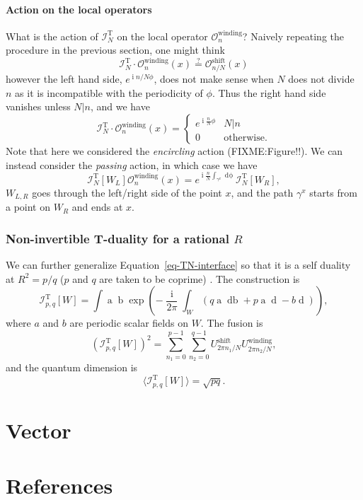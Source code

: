 \documentclass[
  letterpaper,
  DIV=11,
  numbers=noendperiod]{scrreport}
\DeclareMathOperator{\imunit}{i}
\begin{document}
\subsubsection{Action on the local
operators}\label{action-on-the-local-operators}

What is the action of \(\mathcal{I}_N^\text{T}\) on the local operator
\(\mathcal{O}^\text{winding}_n\)? Naively repeating the procedure in the
previous section, one might think \[
\mathcal{I}_N^\text{T} \cdot \mathcal{O}^\text{winding}_n(x) \stackrel{?}{=} \mathcal{O}^\text{shift}_{n/N}(x)
\] however the left hand side, \(e^{\imunit n/N \phi}\), does not make
sense when \(N\) does not divide \(n\) as it is incompatible with the
periodicity of \(\phi\). Thus the right hand side vanishes unless
\(N | n\), and we have \[
\mathcal{I}_N^\text{T} \cdot \mathcal{O}^\text{winding}_n(x) = 
\begin{cases}
e^{\imunit \frac{n}{N}\phi} & N|n \\
0 & \text{otherwise}.
\end{cases}
\] Note that here we considered the \emph{encircling} action
(FIXME:Figure!!). We can instead consider the \emph{passing} action, in
which case we have \[
\mathcal{I}_N^\text{T}[W_L]  \mathcal{O}^\text{winding}_n(x) = 
e^{\imunit \frac{n}{N}\int_{\gamma^x} \mathop{d\phi}} \mathcal{I}_N^\text{T}[W_R],
\] \(W_{L,R}\) goes through the left/right side of the point \(x\), and
the path \(\gamma^x\) starts from a point on \(W_R\) and ends at \(x\).

\subsection{\texorpdfstring{Non-invertible T-duality for a rational
\(R\)}{Non-invertible T-duality for a rational R}}\label{non-invertible-t-duality-for-a-rational-r}

We can further generalize Equation~\ref{eq-TN-interface} so that it is a
self duality at \(R^2 = p/q\) (\(p\) and \(q\) are taken to be coprime)
\autocite{Niro:2022ctq,Cordova:2023ent}. The construction is \[
\mathcal{I}_{p,q}^\text{T}[W]=\int \mathop{\mathcal{D}^W a} \mathop{\mathcal{D}^W b} \exp\left(-\frac{\imunit}{2\pi}  \int_W (q \mathop{a} \mathop{db} +p \mathop{a} \mathop{d\phi_L} - b \mathop{d\phi_R} )\right),
\] where \(a\) and \(b\) are periodic scalar fields on \(W\). The fusion
is \[
(\mathcal{I}_{p,q}^\text{T}[W])^2 = \sum_{n_1=0}^{p-1}\sum_{n_2=0}^{q-1}U^\text{shift}_{2\pi n_1/N}U^\text{winding}_{2\pi n_2/N},
\] and the quantum dimension is \[
\langle \mathcal{I}_{p,q}^\text{T}[W]\rangle = \sqrt{pq}.
\]


\chapter{Vector}\label{sec-vector}


\chapter*{References}\label{references}


\printbibliography[heading=none]
\end{document}
